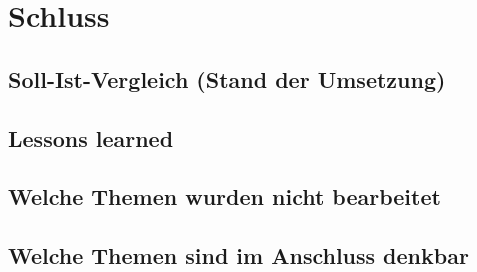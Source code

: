
\chapter{Schluss}
\label{chap:six}
\section{Soll-Ist-Vergleich (Stand der Umsetzung)}
\section{Lessons learned}
\section{Welche Themen wurden nicht bearbeitet}
\section{Welche Themen sind im Anschluss denkbar}
